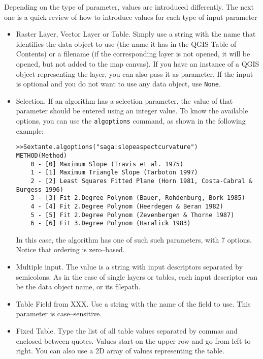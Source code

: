 Depending on the type of parameter, values are introduced differently. The next one is a quick review of how to introduce values for each type of input parameter
\begin{itemize}
	\item Raster Layer, Vector Layer or  Table. Simply use a string with the name that identifies the data object to use (the name it has in the QGIS Table of Contents) or a filename (if the corresponding layer is not opened, it will be opened, but not added to the map canvas). If you have an instance of a QGIS object representing the layer, you can also pass it as parameter. If the input is optional and you do not want to use any data object, use \texttt{None}. 
	\item Selection. If an algorithm has a selection parameter, the value of that parameter should be entered using an integer value. To know the available options, you can use the \texttt{algoptions} command, as shown in the following example:

\begin{verbatim}
>>Sextante.algoptions("saga:slopeaspectcurvature")
METHOD(Method)
	0 - [0] Maximum Slope (Travis et al. 1975)
	1 - [1] Maximum Triangle Slope (Tarboton 1997)
	2 - [2] Least Squares Fitted Plane (Horn 1981, Costa-Cabral & Burgess 1996)
	3 - [3] Fit 2.Degree Polynom (Bauer, Rohdenburg, Bork 1985)
	4 - [4] Fit 2.Degree Polynom (Heerdegen & Beran 1982)
	5 - [5] Fit 2.Degree Polynom (Zevenbergen & Thorne 1987)
	6 - [6] Fit 3.Degree Polynom (Haralick 1983)
\end{verbatim}

In this case, the algorithm has one of such such parameters, with 7 options. Notice that ordering is zero--based.

	\item Multiple input. The value is a string with input descriptors separated by semicolons. As in the case of single layers or tables, each input descriptor can be the data object name, or its filepath.
	
\item Table Field from XXX. Use a string with the name of the field to use. This parameter is case--sensitive.
\item Fixed Table. Type the list of all table values separated by commas and enclosed between quotes. Values start on the upper row and go from left to right. You can also use a 2D array of values representing the table.

\end{itemize}

